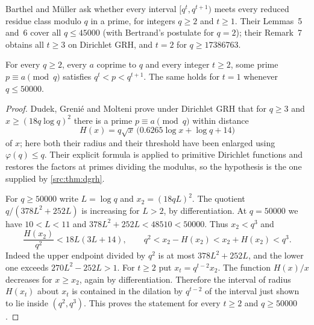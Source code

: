 Barthel and M\"uller \cite{BarthelMuller2022Geometric} ask whether every interval
$[q^t,q^{t+1})$ meets every reduced residue class modulo $q$ in a prime, for integers
$q\ge2$ and $t\ge1$. Their Lemmas~5 and~6 cover all $q\le45000$ (with Bertrand's
postulate for $q=2$); their Remark~7 obtains all $t\ge3$ on Dirichlet GRH, and $t=2$
for $q\ge17386763$.

\begin{theorem}\label{dir:thm:geometric}
For every $q\ge2$, every $a$ coprime to $q$ and every integer $t\ge2$, some prime
$p\equiv a\pmod q$ satisfies $q^t<p<q^{t+1}$. The same holds for $t=1$ whenever
$q\le50000$.
\end{theorem}

\begin{proof}
Dudek, Greni\'e and Molteni \cite[Theorem~1.1 and Table~1]{DudekGrenieMolteni2019Primes}
prove under Dirichlet GRH that for $q\ge3$ and $x\ge(18q\log q)^2$ there is a prime
$p\equiv a\pmod q$ within distance
\[
 H(x)=q\sqrt x\,\bigl(0.6265\log x+\log q+14\bigr)
\]
of $x$; here both their radius and their threshold have been enlarged using
$\varphi(q)\le q$. Their explicit formula is applied to primitive Dirichlet functions
and restores the factors at primes dividing the modulus, so the hypothesis is the one
supplied by \cref{src:thm:dgrh}.

For $q\ge50000$ write $L=\log q$ and $x_2=(18qL)^2$. The quotient $q/(378L^2+252L)$ is
increasing for $L>2$, by differentiation. At $q=50000$ we have $10<L<11$ and
$378L^2+252L<48510<50000$. Thus $x_2<q^3$ and
\[
 \frac{H(x_2)}{q^2}<18L(3L+14),\qquad q^2<x_2-H(x_2)<x_2+H(x_2)<q^3 .
\]
Indeed the upper endpoint divided by $q^2$ is at most $378L^2+252L$, and the lower one
exceeds $270L^2-252L>1$. For $t\ge2$ put $x_t=q^{t-2}x_2$. The function $H(x)/x$
decreases for $x\ge x_2$, again by differentiation. Therefore the interval of radius
$H(x_t)$ about $x_t$ is contained in the dilation by $q^{t-2}$ of the interval just
shown to lie inside $(q^2,q^3)$. This proves the statement for every $t\ge2$ and
$q\ge50000$.


\end{proof}
